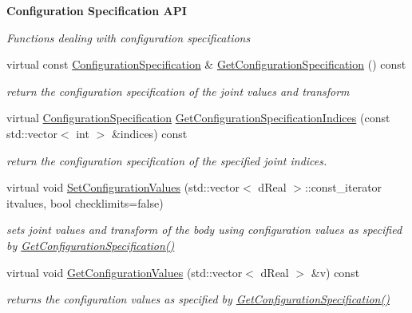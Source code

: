 \begin{Indent}{\bf Configuration Specification API}\par
{\em \label{_amgrp2139ca0333f454b48b4bee2383d4b688}
 Functions dealing with configuration specifications }\begin{DoxyCompactItemize}
\item 
\hypertarget{classOpenRAVE_1_1KinBody_a4e917473a7d475324af43320f83796fc}{
virtual const \hyperlink{classOpenRAVE_1_1ConfigurationSpecification}{ConfigurationSpecification} \& \hyperlink{classOpenRAVE_1_1KinBody_a4e917473a7d475324af43320f83796fc}{GetConfigurationSpecification} () const }
\label{classOpenRAVE_1_1KinBody_a4e917473a7d475324af43320f83796fc}

\begin{DoxyCompactList}\small\item\em return the configuration specification of the joint values and transform \item\end{DoxyCompactList}\item 
virtual \hyperlink{classOpenRAVE_1_1ConfigurationSpecification}{ConfigurationSpecification} \hyperlink{classOpenRAVE_1_1KinBody_af7fef3f4f3e970937d82cac5b2e25dc6}{GetConfigurationSpecificationIndices} (const std::vector$<$ int $>$ \&indices) const 
\begin{DoxyCompactList}\small\item\em return the configuration specification of the specified joint indices. \item\end{DoxyCompactList}\item 
virtual void \hyperlink{classOpenRAVE_1_1KinBody_ad5dc4cc6b247465c2522c31a9169cfd0}{SetConfigurationValues} (std::vector$<$ dReal $>$::const\_\-iterator itvalues, bool checklimits=false)
\begin{DoxyCompactList}\small\item\em sets joint values and transform of the body using configuration values as specified by \hyperlink{classOpenRAVE_1_1KinBody_a4e917473a7d475324af43320f83796fc}{GetConfigurationSpecification()} \item\end{DoxyCompactList}\item 
\hypertarget{classOpenRAVE_1_1KinBody_a9d2332ddf65fc655aa7ebaa39223ee66}{
virtual void \hyperlink{classOpenRAVE_1_1KinBody_a9d2332ddf65fc655aa7ebaa39223ee66}{GetConfigurationValues} (std::vector$<$ dReal $>$ \&v) const }
\label{classOpenRAVE_1_1KinBody_a9d2332ddf65fc655aa7ebaa39223ee66}

\begin{DoxyCompactList}\small\item\em returns the configuration values as specified by \hyperlink{classOpenRAVE_1_1KinBody_a4e917473a7d475324af43320f83796fc}{GetConfigurationSpecification()} \item\end{DoxyCompactList}\end{DoxyCompactItemize}
\end{Indent}
